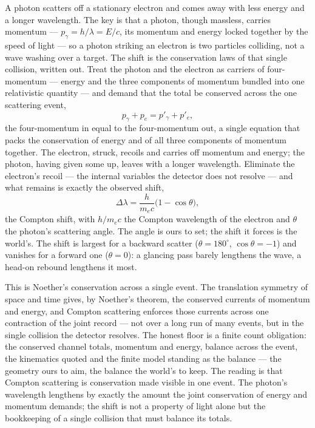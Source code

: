 A photon scatters off a stationary electron and comes away with less energy and a longer wavelength. The key
is that a photon, though massless, carries momentum --- $p_\gamma = h/\lambda = E/c$, its momentum and energy
locked together by the speed of light --- so a photon striking an electron is two particles colliding, not a
wave washing over a target. The shift is the conservation laws of that single collision, written out. Treat
the photon and the electron as carriers of four-momentum --- energy and the three components of momentum bundled into one relativistic quantity --- and
demand that the total be conserved across the one scattering event,
\begin{equation}
  p_\gamma + p_e = p'_\gamma + p'_e,
\end{equation}
the four-momentum in equal to the four-momentum out, a single equation that packs the conservation of energy
and of all three components of momentum together. The electron, struck, recoils and carries off momentum and
energy; the photon, having given some up, leaves with a longer wavelength. Eliminate the electron's recoil ---
the internal variables the detector does not resolve --- and what remains is exactly the observed shift,
\begin{equation}
  \Delta\lambda = \frac{h}{m_e c}\bigl(1 - \cos\theta\bigr),
\end{equation}
the Compton shift, with $h/m_e c$ the Compton wavelength of the electron and $\theta$ the photon's scattering
angle. The angle is ours to set; the shift it forces is the world's. The shift is largest for a backward scatter ($\theta = 180^\circ$, $\cos\theta = -1$) and vanishes for a
forward one ($\theta = 0$): a glancing pass barely lengthens the wave, a head-on rebound lengthens it most.

This is Noether's conservation across a single event. The translation symmetry of space and time gives, by
Noether's theorem, the conserved currents of momentum and energy, and Compton scattering enforces those
currents across one contraction of the joint record --- not over a long run of many events, but in the single
collision the detector resolves. The honest floor is a finite count obligation: the conserved channel totals,
momentum and energy, balance across the event, the kinematics quoted and the finite model standing as the
balance --- the geometry ours to aim, the balance the world's to keep. The reading is that Compton scattering
is conservation made visible in one event. The photon's
wavelength lengthens by exactly the amount the joint conservation of energy and momentum demands; the shift is
not a property of light alone but the bookkeeping of a single collision that must balance its totals.

